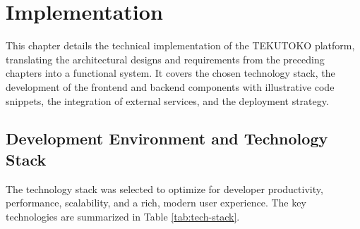 \chapter{Implementation}
\label{chap:implementation}

This chapter details the technical implementation of the TEKUTOKO platform, translating the architectural designs and requirements from the preceding chapters into a functional system. It covers the chosen technology stack, the development of the frontend and backend components with illustrative code snippets, the integration of external services, and the deployment strategy.

\section{Development Environment and Technology Stack}
\label{sec:impl-stack}
The technology stack was selected to optimize for developer productivity, performance, scalability, and a rich, modern user experience. The key technologies are summarized in Table \ref{tab:tech-stack}.

